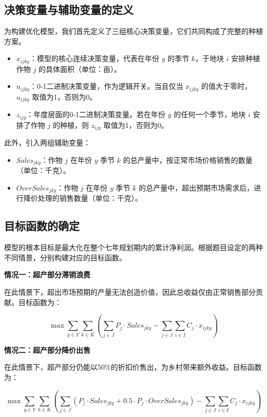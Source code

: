 \documentclass[withoutpreface,bwprint]{cumcmthesis} %
\begin{document}
\subsection{决策变量与辅助变量的定义}

为构建优化模型，我们首先定义了三组核心决策变量，它们共同构成了完整的种植方案。
\begin{itemize}
	\item $x_{ijky}$：模型的核心连续决策变量，代表在年份 $y$ 的季节 $k$，于地块 $i$ 安排种植作物 $j$ 的具体面积（单位：亩）。
	\item $u_{ijky}$：0-1二进制决策变量，作为逻辑开关。当且仅当 $x_{ijky}$ 的值大于零时，$u_{ijky}$ 取值为1，否则为0。
	\item $z_{ijy}$：年度层面的0-1二进制决策变量。若在年份 $y$ 的任何一个季节，地块 $i$ 安排了作物 $j$ 的种植，则 $z_{ijy}$ 取值为1，否则为0。
\end{itemize}

此外，引入两组辅助变量：
\begin{itemize}
	\item $Sales_{jky}$：作物 $j$ 在年份 $y$ 季节 $k$ 的总产量中，按正常市场价格销售的数量（单位：千克）。
	\item $OverSales_{jky}$：作物 $j$ 在年份 $y$ 季节 $k$ 的总产量中，超出预期市场需求后，进行降价处理的销售数量（单位：千克）。
\end{itemize}

\subsection{目标函数的确定}

模型的根本目标是最大化在整个七年规划期内的累计净利润。根据题目设定的两种不同情景，分别构建对应的目标函数。

\textbf{情况一：超产部分滞销浪费}

在此情景下，超出市场预期的产量无法创造价值，因此总收益仅由正常销售部分贡献。目标函数为：

\begin{equation}
	\max \sum_{y \in Y} \sum_{k \in K} \left( \sum_{j \in J} P_j \cdot Sales_{jky} - \sum_{j \in J} \sum_{i \in I} C_j \cdot x_{ijky} \right)
\end{equation}

\textbf{情况二：超产部分降价出售}

在此情景下，超产部分仍能以50\%的折扣价售出，为乡村带来额外收益。目标函数为：

\begin{equation}
	\max \sum_{y \in Y} \sum_{k \in K} \left( \sum_{j \in J} (P_j \cdot Sales_{jky} + 0.5 \cdot P_j \cdot OverSales_{jky}) - \sum_{j \in J} \sum_{i \in I} C_j \cdot x_{ijky} \right)
\end{equation}
\end{document}
